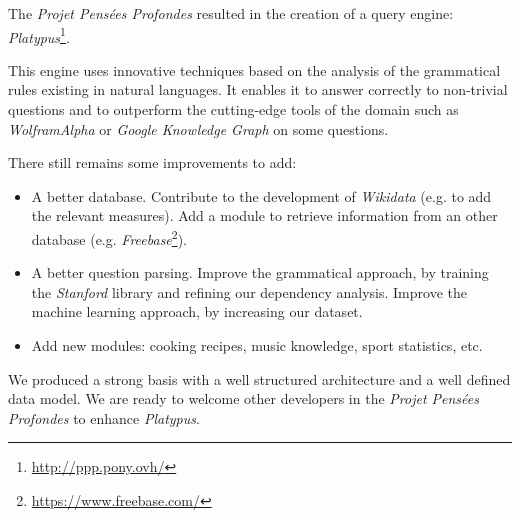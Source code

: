 The \emph{Projet Pensées Profondes} resulted in the creation of a query engine: \emph{Platypus}\footnote{\url{http://ppp.pony.ovh/}}.

This engine uses innovative techniques based on the analysis of the grammatical rules existing in natural languages. It enables it to answer correctly to non-trivial questions and to outperform the cutting-edge tools of the domain such as \emph{WolframAlpha} or \emph{Google Knowledge Graph} on some questions.

There still remains some improvements to add:
\begin{itemize}
    \item A better database. Contribute to the development of \emph{Wikidata} (e.g. to add the relevant measures). Add a module to retrieve information from an other database (e.g. \emph{Freebase}\footnote{\url{https://www.freebase.com/}}).
    \item A better question parsing. Improve the grammatical approach, by training the \emph{Stanford} library and refining our dependency analysis. Improve the machine learning approach, by increasing our dataset.
    \item Add new modules: cooking recipes, music knowledge, sport statistics, etc.
\end{itemize}

We produced a strong basis with a well structured architecture and a well defined data model. We are ready to welcome other developers in the \emph{Projet Pensées Profondes} to enhance \emph{Platypus}.
